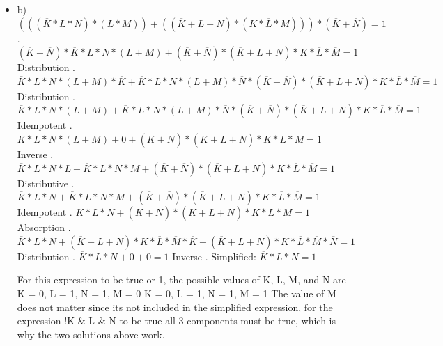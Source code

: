 \documentclass{article}
\begin{document}
\begin{itemize}
    
    \item b) $(((\overline{K} * L * N) * (L * M)) + ((\overline{K} + L + N) * (K * \overline{L} * M))) * (\overline{K} + \overline{N}) = 1$ . $(\overline{K} + \overline{N}) * \overline{K} * L * N * (L + M) + (\overline{K} + \overline{N}) * (\overline{K} + L + N) * K * \overline{L} * \overline{M} = 1$ Distribution . $\overline{K} * L * N * (L + M) * \overline{K} + \overline{K} * L * N * (L + M) * \overline{N} * (\overline{K} + \overline{N}) * (\overline{K} + L + N) * K * \overline{L} * \overline{M} = 1$ Distribution . $\overline{K} * L * N * (L + M) + \overline{K} * L * N * (L + M) * \overline{N} * (\overline{K} + \overline{N}) * (\overline{K} + L + N) * K * \overline{L} * \overline{M} = 1$ Idempotent . $\overline{K} * L * N * (L + M) + 0 + (\overline{K} + \overline{N}) * (\overline{K} + L + N) * K * \overline{L} * \overline{M} = 1$ Inverse . $\overline{K} * L * N * L + \overline{K} * L * N * M + (\overline{K} + \overline{N}) * (\overline{K} + L + N) * K * \overline{L} * \overline{M} = 1$ Distributive . $\overline{K} * L * N + \overline{K} * L * N * M + (\overline{K} + \overline{N}) * (\overline{K} + L + N) * K * \overline{L} * \overline{M} = 1$ Idempotent . $\overline{K} * L * N + (\overline{K} +\overline{N}) * (\overline{K} + L + N) * K * \overline{L} * \overline{M} = 1$ Absorption . $\overline{K} * L * N + (\overline{K} + L + N) * K * \overline{L} * \overline{M} * \overline{K} + (\overline{K} + L + N) * K * \overline{L} * \overline{M} * \overline{N} = 1$ Distribution . $\overline{K} * L * N + 0 + 0 = 1$ Inverse . Simplified: $\overline{K} * L * N = 1$ \newline 
    
    For this expression to be true or 1, the possible values of K, L, M, and N are \newline
    K = {0}, L = {1}, N = {1}, M = {0} \newline
    K = {0}, L = {1}, N = {1}, M = {1} \newline
    The value of M does not matter since its not included in the simplified expression, for the expression !K \& L \& N to be true all 3 components must be true, which is why the two solutions above work. \newline
\end{itemize}
\end{document}
